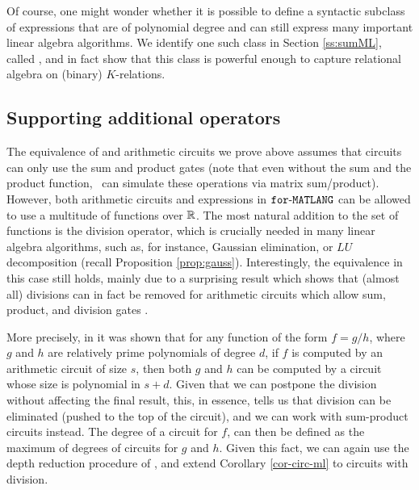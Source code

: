 
Of course, one might wonder whether it is possible to define a syntactic subclass of \langfor expressions that are of polynomial degree and can still express many important linear algebra algorithms. We identify one such class in Section \ref{ss:sumML}, called \langsum, and in fact show that this class is powerful enough to capture relational algebra on (binary) $K$-relations. 



\subsection{Supporting additional operators}

%
%
%

The equivalence of \langfor and arithmetic circuits we prove above assumes that circuits can only use the sum and product gates (note that even without the sum and the product function, \langfor\ can simulate these operations via matrix sum/product). However, both arithmetic circuits and expressions in $\texttt{for}\text{-}\texttt{MATLANG}$ can be allowed to use a multitude of functions over $\mathbb{R}$. The most natural addition to the set of functions is the division operator, which is crucially needed in many linear algebra algorithms, such as, for instance, Gaussian elimination, or $LU$ decomposition (recall Proposition \ref{prop:gauss}).
Interestingly, the equivalence in this case still holds, mainly due to a surprising result which shows that (almost all) divisions can in fact be removed for arithmetic circuits which allow sum, product, and division gates \cite{allender}.

More precisely, in \cite{strassen1973vermeidung,borodin1982fast,kaltofen1988greatest} it was shown that for any function of the form $f = g/h$, where $g$ and $h$ are relatively prime polynomials of degree $d$, if $f$ is computed by an arithmetic circuit of size $s$, then both $g$ and $h$ can be computed by a circuit whose size is polynomial in $s + d$. Given that we can postpone the division without affecting the final result, this, in essence, tells us that division can be eliminated (pushed to the top of the circuit), and we can work with sum-product circuits instead. The degree of a circuit for $f$, can then be defined as the maximum of degrees of circuits for $g$ and $h$. Given this fact, we can again use the depth reduction procedure of \cite{AllenderJMV98}, and extend Corollary \ref{cor-circ-ml} to circuits with division.


